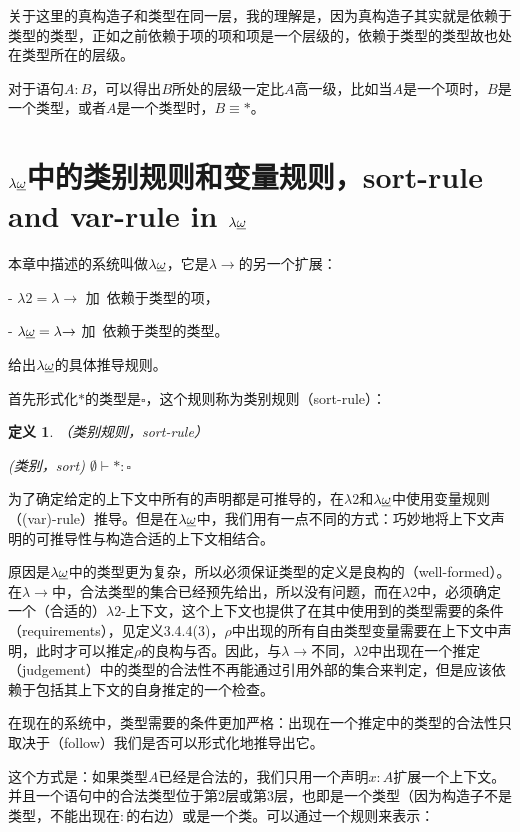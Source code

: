 \documentclass[UTF8]{article}
\newtheorem{thm}{定义}[section]
\begin{document}
		关于这里的真构造子和类型在同一层，我的理解是，因为真构造子其实就是依赖于类型的类型，正如之前依赖于项的项和项是一个层级的，依赖于类型的类型故也处在类型所在的层级。
	
		对于语句$A:B$，可以得出$B$所处的层级一定比$A$高一级，比如当$A$是一个项时，$B$是一个类型，或者$A$是一个类型时，$B\equiv*$。
		
	\section{$\lambda{\uline{\omega}}$中的类别规则和变量规则，sort-rule and var-rule in $\lambda{\uline{\omega}}$}
		\noindent
		本章中描述的系统叫做$\lambda{\uline{\omega}}$，它是$\lambda{\rightarrow}$的另一个扩展：
		
		\noindent
		- $\lambda{2} = \lambda{\rightarrow}$ 加\ 依赖于类型的项，
		
		\noindent
		- $\lambda{\uline{\omega}} = \lambda{\rightarrow}$ 加\ 依赖于类型的类型。
		
		给出$\lambda{\uline{\omega}}$的具体推导规则。
		
		首先形式化$*$的类型是$\square$，这个规则称为类别规则（sort-rule）：
		
		\begin{thm} （类别规则，sort-rule）
			
			(类别，sort) $\emptyset \vdash *:\square$
		\end{thm}
	
		为了确定给定的上下文中所有的声明都是可推导的，在$\lambda{2}$和$\lambda{\uline{\omega}}$中使用变量规则（(var)-rule）推导。但是在$\lambda{\uline{\omega}}$中，我们用有一点不同的方式：巧妙地将上下文声明的可推导性与构造合适的上下文相结合。
		
		原因是$\lambda{\uline{\omega}}$中的类型更为复杂，所以必须保证类型的定义是良构的（well-formed）。在$\lambda{\rightarrow}$中，合法类型的集合已经预先给出，所以没有问题，而在$\lambda{2}$中，必须确定一个（合适的）$\lambda{2}$-上下文，这个上下文也提供了在其中使用到的类型需要的条件（requirements），见定义3.4.4(3)，$\rho$中出现的所有自由类型变量需要在上下文中声明，此时才可以推定$\rho$的良构与否。因此，与$\lambda{\rightarrow}$不同，$\lambda{2}$中出现在一个推定（judgement）中的类型的合法性不再能通过引用外部的集合来判定，但是应该依赖于包括其上下文的自身推定的一个检查。
		
		在现在的系统中，类型需要的条件更加严格：出现在一个推定中的类型的合法性只取决于（follow）我们是否可以形式化地推导出它。
		
		这个方式是：如果类型$A$已经是合法的，我们只用一个声明$x:A$扩展一个上下文。并且一个语句中的合法类型位于第2层或第3层，也即是一个类型（因为构造子不是类型，不能出现在$:$的右边）或是一个类。可以通过一个规则来表示：
		
\end{document}
